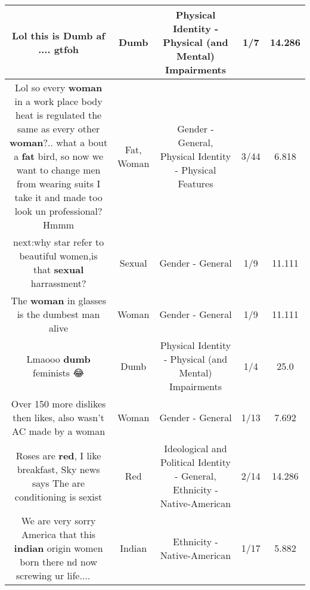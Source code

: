 \documentclass[11pt]{article}
\newlength\mylength
\begin{document}
\begin{center}
\begin{longtable}{|C{.65\mylength}|C{.30\mylength}|C{.12\mylength}|C{.12\mylength}|C{.12\mylength}|}
  \small Lol this is \textbf{Dumb} af ....   gtfoh\normalsize   & Dumb & Physical Identity - Physical (and Mental) Impairments & 1/7 & 14.286 \\  \hline
  \small Lol so every \textbf{woman} in a work place body heat is regulated the same as every other \textbf{woman}?.. what a bout a \textbf{fat} bird, so now we want to change men from wearing suits I take it and made too look un professional? Hmmm\normalsize   & Fat, Woman & Gender - General, Physical Identity - Physical Features & 3/44 & 6.818 \\  \hline
  \small next:why star refer to beautiful women,is that \textbf{sexual} harrassment?\normalsize   & Sexual & Gender - General & 1/9 & 11.111 \\  \hline
  \small The \textbf{woman} in glasses is the dumbest man alive\normalsize   & Woman & Gender - General & 1/9 & 11.111 \\  \hline
  \small Lmaooo \textbf{dumb} feminists 😂\normalsize   & Dumb & Physical Identity - Physical (and Mental) Impairments & 1/4 & 25.0 \\  \hline
  \small Over 150 more dislikes then likes, also wasn't AC made by a woman\normalsize   & Woman & Gender - General & 1/13 & 7.692 \\  \hline
  \small Roses are \textbf{r\textbf{ed}}, I like breakfast, Sky news says The are conditioning is sexist\normalsize   & Red &  Ideological and Political Identity - General, Ethnicity - Native-American & 2/14 & 14.286 \\  \hline
  \small We are very sorry America that this \textbf{indian} origin women born there nd now screwing ur life....🙏😳🤦‍♂️\normalsize   & Indian & Ethnicity - Native-American & 1/17 & 5.882 \\  \hline

\end{longtable}
\end{center}
\end{document}
